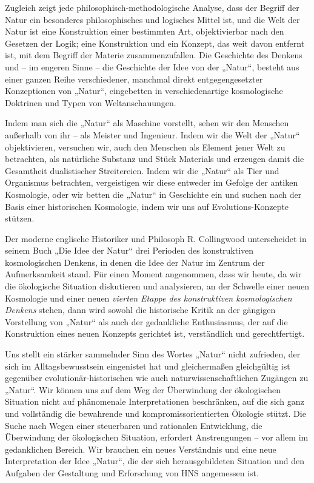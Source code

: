 \documentclass[11pt,a4paper]{article}
\begin{document}
Zugleich zeigt jede philosophisch-methodologische Analyse, dass der Begriff
der Natur ein besonderes philosophisches und logisches Mittel ist, und die
Welt der Natur ist eine Konstruktion einer bestimmten Art, objektivierbar nach
den Gesetzen der Logik; eine Konstruktion und ein Konzept, das weit davon
entfernt ist, mit dem Begriff der Materie zusammenzufallen. Die Geschichte des
Denkens und -- im engeren Sinne -- die Geschichte der Idee von der „Natur“,
besteht aus einer ganzen Reihe verschiedener, manchmal direkt
entgegengesetzter Konzeptionen von „Natur“, eingebetten in verschiedenartige
kosmologische Doktrinen und Typen von Weltanschauungen.

Indem man sich die „Natur“ als Maschine vorstellt, sehen wir den Menschen
außerhalb von ihr -- als Meister und Ingenieur. Indem wir die Welt der „Natur“
objektivieren, versuchen wir, auch den Menschen als Element jener Welt zu
betrachten, als natürliche Substanz und Stück Materials und erzeugen damit die
Gesamtheit dualistischer Streitereien. Indem wir die „Natur“ als Tier und
Organismus betrachten, vergeistigen wir diese entweder im Gefolge der antiken
Kosmologie, oder wir betten die „Natur“ in Geschichte ein und suchen nach der
Basis einer historischen Kosmologie, indem wir uns auf Evolutions-Konzepte
stützen.

Der moderne englische Historiker und Philosoph R. Collingwood unterscheidet in
seinem Buch „Die Idee der Natur“ drei Perioden des konstruktiven
kosmologischen Denkens, in denen die Idee der Natur im Zentrum der
Aufmerksamkeit stand. Für einen Moment angenommen, dass wir heute, da wir die
ökologische Situation diskutieren und analysieren, an der Schwelle einer neuen
Kosmologie und einer neuen \emph{vierten Etappe des konstruktiven
  kosmologischen Denkens} stehen, dann wird sowohl die historische Kritik an
der gängigen Vorstellung von „Natur“ als auch der gedankliche Enthusiasmus,
der auf die Konstruktion eines neuen Konzepts gerichtet ist, verständlich und
gerechtfertigt.

Uns stellt ein stärker sammelnder Sinn des Wortes „Natur“ nicht zufrieden, der
sich im Alltagsbewusstsein eingenistet hat und gleichermaßen gleichgültig ist
gegenüber evolutionär-historischen wie auch naturwissenschaftlichen Zugängen
zu „Natur“. Wir können uns auf dem Weg der Überwindung der ökologischen
Situation nicht auf phänomenale Interpretationen beschränken, auf die sich
ganz und vollständig die bewahrende und kompromissorientierten Ökologie
stützt.  Die Suche nach Wegen einer steuerbaren und rationalen Entwicklung,
die Überwindung der ökologischen Situation, erfordert Anstrengungen -- vor
allem im gedanklichen Bereich. Wir brauchen ein neues Verständnis und eine
neue Interpretation der Idee „Natur“, die der sich herausgebildeten Situation
und den Aufgaben der Gestaltung und Erforschung von HNS angemessen ist.
\end{document}

